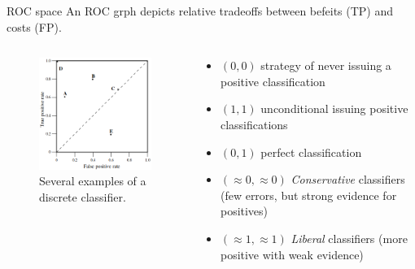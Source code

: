 \documentclass{beamer}
\begin{document}
\begin{frame}{ROC space}
  An ROC grph depicts relative tradeoffs between befeits (TP) and costs (FP).
  \begin{columns}
    \begin{column}{0.4\textwidth}
  \begin{figure}
  \includegraphics[width=0.8\linewidth]{ROC}
  \caption{Several examples of a discrete classifier\cite{fawcettIntroductionROCAnalysis2006}.}
\end{figure}
\end{column}
\begin{column}{0.6\textwidth}
  \begin{itemize}
    \item $(0,0)$ strategy of never issuing a positive classification
    \item $(1,1)$ unconditional issuing positive classifications
    \item $(0,1)$ perfect classification
    \item $(\approx 0, \approx 0)$ {\em Conservative} classifiers (few errors, but strong evidence for positives)
    \item $(\approx 1, \approx 1)$ {\em Liberal} classifiers (more positive with weak evidence)
  \end{itemize}
\end{column}
\end{columns}
\end{frame}
\end{document}

